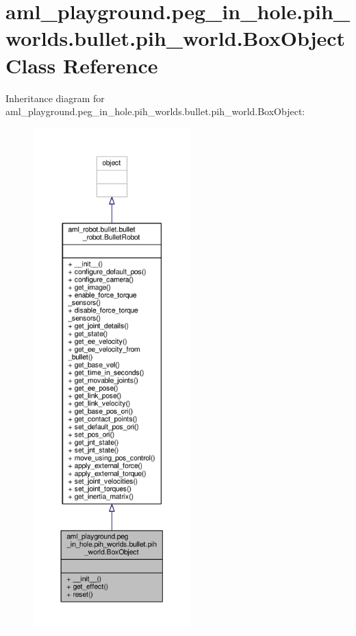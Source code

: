 \hypertarget{classaml__playground_1_1peg__in__hole_1_1pih__worlds_1_1bullet_1_1pih__world_1_1_box_object}{\section{aml\-\_\-playground.\-peg\-\_\-in\-\_\-hole.\-pih\-\_\-worlds.\-bullet.\-pih\-\_\-world.\-Box\-Object Class Reference}
\label{classaml__playground_1_1peg__in__hole_1_1pih__worlds_1_1bullet_1_1pih__world_1_1_box_object}
}


Inheritance diagram for aml\-\_\-playground.\-peg\-\_\-in\-\_\-hole.\-pih\-\_\-worlds.\-bullet.\-pih\-\_\-world.\-Box\-Object\-:\nopagebreak
\begin{figure}[H]
\begin{center}
\leavevmode
\includegraphics[height=550pt]{classaml__playground_1_1peg__in__hole_1_1pih__worlds_1_1bullet_1_1pih__world_1_1_box_object__inherit__graph}
\end{center}
\end{figure}



